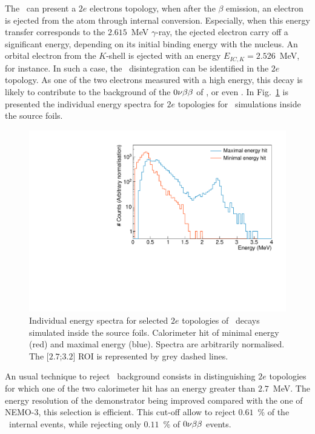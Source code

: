 The \Tl\ can present a $2e$ electrons topology, when after the $\beta$ emission, an electron is ejected from the atom through internal conversion.
Especially, when this energy transfer corresponds to the $2.615$~MeV $\gamma$-ray, the ejected electron carry off a significant energy, depending on its initial binding energy with the nucleus.
An orbital electron from the $K$-shell is ejected with an energy $E_{IC,K}=2.526$~MeV, for instance.
In such a case, the \Tl\ disintegration can be identified in the $2e$ topology.
As one of the two electrons measured with a high energy, this decay is likely to contribute to the background of the $0\nu\beta\beta$ of \Se, or even \Nd.
In Fig.~\ref{fig:Emin_Emax_Tl} is presented the individual energy spectra for $2e$ topologies for \Tl\ simulations inside the source foils.
\begin{figure}[!h]
  \centering
  \includegraphics[width=13cm]{timedifference/fig_timediff/energy_spect_min_max_208Tl.pdf}
  \caption{Individual energy spectra for selected $2e$ topologies of \Tl\ decays simulated inside the source foils.
    Calorimeter hit of minimal energy (red) and maximal energy (blue).
    Spectra are arbitrarily normalised.
    The [$2.7$;$3.2$] ROI is represented by grey dashed lines.
    \label{fig:Emin_Emax_Tl}}
\end{figure}
An usual technique to reject \Tl\ background consists in distinguishing $2e$ topologies for which one of the two calorimeter hit has an energy greater than $2.7$~MeV.
The energy resolution of the demonstrator being improved compared with the one of NEMO-$3$, this selection is efficient.
This cut-off allow to reject $0.61$~\% of the \Tl\ internal events, while rejecting only $0.11$~\% of $0\nu\beta\beta$ events.

